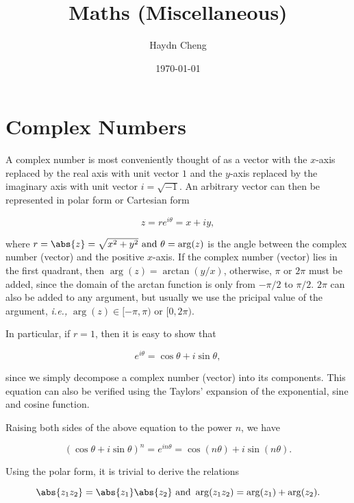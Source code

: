\documentclass[english,a4paper,12pt]{report}
\title{Maths (Miscellaneous)}
\author{Haydn Cheng}
\date{\today}
\begin{document}
\maketitle
\tableofcontents

\chapter{Complex Numbers}

A complex number is most conveniently thought of as a vector with the \(x\)-axis replaced by the real axis with unit vector \(1\) and the \(y\)-axis replaced by the imaginary axis with unit vector \(i = \sqrt{-1} \). An arbitrary vector can then be represented in polar form or Cartesian form

\begin{equation}
	z = re^{i \theta } = x + iy, 
\end{equation}

where \( r = \abs{z} = \sqrt{x^2 + y^2} \text { and } \theta = \arg (z)\) is the angle between the complex number (vector) and the positive \(x\)-axis. If the complex number (vector) lies in the first quadrant, then \(\arg (z) = \arctan {\left(y /x \right)} \), otherwise, \(\pi \text { or } 2\pi \) must be added, since the domain of the arctan function is only from \(- \pi /2\) to \(\pi  /2 \). \(2\pi \) can also be added to any argument, but usually we use the pricipal value of the argument, \textit{i.e.,} \(\arg (z) \in [-\pi , \pi ) \text { or } [0,2\pi )\).   

In particular, if \(r=1\), then it is easy to show that 

\begin{equation}
	e^{i \theta } = \cos \theta + i\sin \theta ,
\end{equation}

since we simply decompose a complex number (vector) into its components. This equation can also be verified using the Taylors' expansion of the exponential, sine and cosine function.

Raising both sides of the above equation to the power \(n\), we have

\begin{equation}
	(\cos \theta + i \sin \theta )^{n} = e^{i n \theta } = \cos (n \theta ) + i \sin (n \theta ).
\end{equation}

Using the polar form, it is trivial to derive the relations

\begin{equation}
	\abs{z_1 z_2 } = \abs{z_1 }\abs{z_2 } \text { and } \arg (z_1 z_2 ) = \arg (z_1 ) + \arg (z_2 ).
\end{equation}
\end{document}
